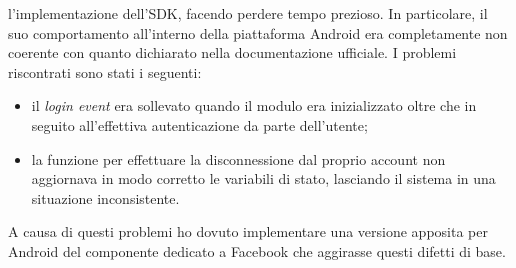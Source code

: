 				l'implementazione dell'SDK, facendo perdere tempo prezioso. In particolare, il suo comportamento all'interno della
				piattaforma Android era completamente non coerente con quanto dichiarato nella documentazione ufficiale. I problemi
				riscontrati sono stati i seguenti:
				\begin{itemize}
					\item il \emph{login event} era sollevato quando il modulo era inizializzato oltre che in seguito
					all'effettiva autenticazione da parte dell'utente;
					\item la funzione per effettuare la disconnessione dal proprio account non aggiornava in modo corretto le
					variabili di stato, lasciando il sistema in una situazione inconsistente.
				\end{itemize}
				A causa di questi problemi ho dovuto implementare una versione apposita per Android del componente dedicato a
				Facebook che aggirasse questi difetti di base.
